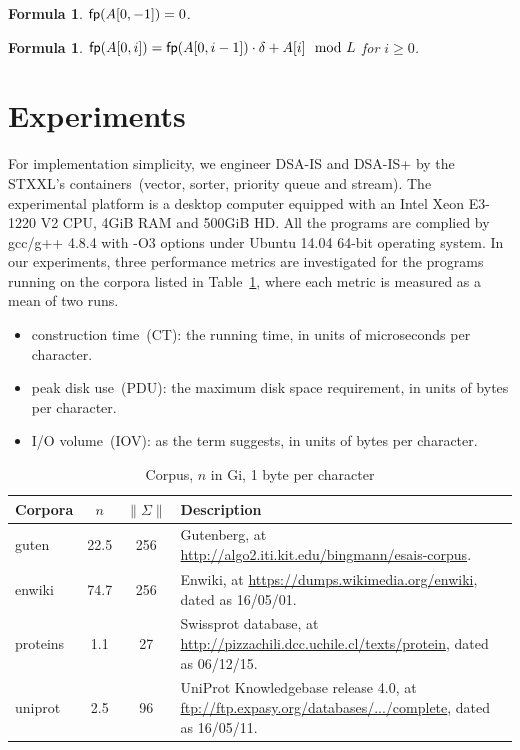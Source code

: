\documentclass[10pt,journal,compsoc]{IEEEtran}
\newtheorem{formula}[theorem]{Formula}
\begin{document}
{\begin{formula} \label{formula:1}${\sf fp}(A[0, -1]) = 0$. 
\end{formula}

\begin{formula} \label{formula:2}${\sf fp}(A[0, i]) = {\sf fp}(A[0, i - 1]) \cdot {\delta} + A[i]\mod L$ for $i \ge 0$.
\end{formula}



\section{Experiments} \label{sec:experiments}

For implementation simplicity, we engineer DSA-IS and DSA-IS+ by the STXXL's containers~(vector, sorter, priority queue and stream). The experimental platform is a desktop computer equipped with an Intel Xeon E3-1220 V2 CPU, 4GiB RAM and 500GiB HD. All the programs are complied by gcc/g++ 4.8.4 with -O3 options under Ubuntu 14.04 64-bit operating system. In our experiments, three performance metrics are investigated for the programs running on the corpora listed in Table~\ref{tbl:corpora}, where each metric is measured as a mean of two runs.

\begin{itemize}
	\item construction time~(CT): the running time, in units of microseconds per character.
	\item peak disk use~(PDU): the maximum disk space requirement, in units of bytes per character.
	\item I/O volume~(IOV): as the term suggests, in units of bytes per character.
\end{itemize}

\renewcommand\arraystretch{1.3}
\begin{table}[!h]
	\caption{Corpus, $n$ in Gi, 1 byte per character} 
	\label{tbl:corpora}
	\centering
	\begin{tabular}{|l|c|c|p{5cm}|}
		\hline
		Corpora & \multicolumn{1}{c|}{$n$} & \multicolumn{1}{c|}{$\|\Sigma\|$} & Description \\\hline
		guten & 22.5 & 256 & Gutenberg, at \url{http://algo2.iti.kit.edu/bingmann/esais-corpus}.\\\hline 				
		enwiki & 74.7 & 256 & Enwiki, at \url{https://dumps.wikimedia.org/enwiki}, dated as 16/05/01. \\\hline	
		proteins & 1.1 & 27 & Swissprot database, at \url{http://pizzachili.dcc.uchile.cl/texts/protein}, dated as 06/12/15. \\\hline
		uniprot & 2.5 & 96 & UniProt Knowledgebase release 4.0, at \url{ftp://ftp.expasy.org/databases/.../complete}, dated as 16/05/11. \\\hline
	\end{tabular}
\end{table}

}
\end{document}
